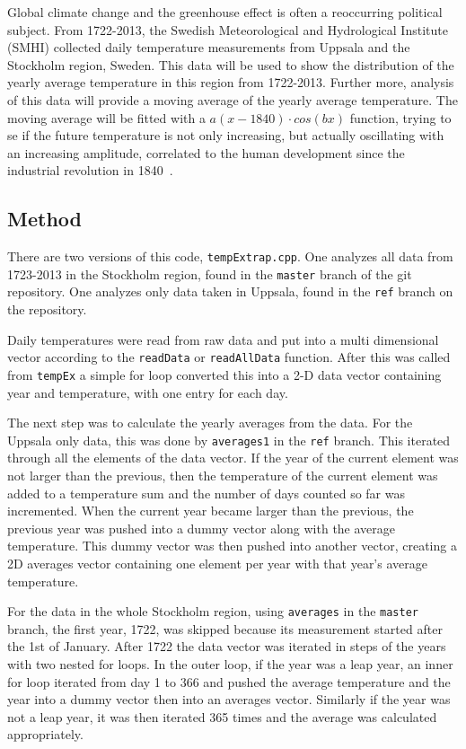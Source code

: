 

Global climate change and the greenhouse effect is often a reoccurring political subject. From 1722-2013, the Swedish Meteorological and Hydrological Institute (SMHI) collected daily temperature measurements from Uppsala and the Stockholm region, Sweden. This data will be used to show the distribution of the yearly average temperature in this region from 1722-2013. Further more, analysis of this data will provide a moving average of the yearly average temperature. The moving average will be fitted with a $a(x-1840)\cdot cos(bx)$ function, trying to se if the future temperature is not only increasing, but actually oscillating with an increasing amplitude, correlated to the human development since the industrial revolution in 1840~\cite{industrial}.

\subsection{Method}
There are two versions of this code, \texttt{tempExtrap.cpp}. One analyzes all data from 1723-2013 in the Stockholm region, found in the \texttt{master} branch of the git repository. One analyzes only data taken in Uppsala, found in the \texttt{ref} branch on the repository.

Daily temperatures were read from raw data and put into a multi dimensional vector according to the \texttt{readData} or \texttt{readAllData} function. After this was called from \texttt{tempEx} a simple for loop converted this into a 2-D data vector containing year and temperature, with one entry for each day.

The next step was to calculate the yearly averages from the data. For the Uppsala only data, this was done by \texttt{averages1} in the \texttt{ref} branch. This iterated through all the elements of the data vector. If the year of the current element was not larger than the previous, then the temperature of the current element was added to a temperature sum and the number of days counted so far was incremented. When the current year became larger than the previous, the previous year was pushed into a dummy vector along with the average temperature. This dummy vector was then pushed into another vector, creating a 2D averages vector containing one element per year with that year's average temperature.

For the data in the whole Stockholm region, using \texttt{averages} in the \texttt{master} branch, the first year, 1722, was skipped because its measurement started after the 1st of January. After 1722 the data vector was iterated in steps of the years with two nested for loops. In the outer loop, if the year was a leap year, an inner for loop iterated from day 1 to 366 and pushed the average temperature and the year into a dummy vector then into an averages vector. Similarly if the year was not a leap year, it was then iterated 365 times and the average was calculated appropriately.

